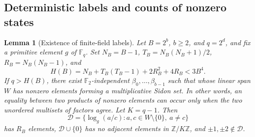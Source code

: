\documentclass[a4paper,11pt]{article}
\newtheorem{lemma}{Lemma}[section]
\theoremstyle{remark}
\begin{document}
\subsection{Deterministic labels and counts of nonzero states}
\begin{lemma}[Existence of finite-field labels]\label{lem:papersidon}
Let $B=2^b$, $b\ge2$, and $q=2^d$, and fix a primitive element $g$ of $\mathbb F_q$.
Set $N_B = B - 1$, $T_B = N_B(N_B+1)/2$, $R_B = N_B(N_B-1)$, and
\[
 H(B)=N_B+T_B(T_B-1)+2R_B^2+4R_B<3B^4.
\]
If $q > H(B)$, there exist $\mathbb F_2$-independent $\beta_0, \ldots, \beta_{b-1}$ such that
whose linear span $W$ has nonzero elements forming a multiplicative Sidon set. In other words, an equality between two products of nonzero elements
can occur only when the two unordered multisets of factors agree. Let $K=q-1$. Then
\[
 \mathcal D=\{\log_g(a/c):a,c\in W\setminus\{0\},\ a\ne c\}
\]
has $R_B$ elements, $\mathcal D\cup\{0\}$ has no adjacent elements in $\mathbb Z/K\mathbb Z$,
and $\pm 1, \pm 2 \notin \mathcal D$.
\end{lemma}
\end{document}

